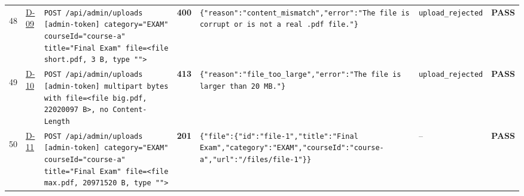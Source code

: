 \documentclass[10pt,a4paper]{article}
\begin{document}
\begin{landscape}
\begin{longtable}{@{}P{0.6cm}P{0.9cm}P{8.5cm}P{1.0cm}P{6.2cm}P{4.2cm}P{1.1cm}@{}}
\hypertarget{call48}{48} & \hyperlink{test-D-09}{D-09} & \texttt{POST /\allowbreak{}api/\allowbreak{}admin/\allowbreak{}uploads [admin-\allowbreak{}token] category=\allowbreak{}"\allowbreak{}EXAM"\allowbreak{} courseId=\allowbreak{}"\allowbreak{}course-\allowbreak{}a"\allowbreak{} title=\allowbreak{}"\allowbreak{}Final Exam"\allowbreak{} file=\allowbreak{}<file short.\allowbreak{}pdf,\allowbreak{} 3 B,\allowbreak{} type "\allowbreak{}"\allowbreak{}>} & \textcolor{warnamber}{\textbf{400}} & \texttt{\{"\allowbreak{}reason"\allowbreak{}:\allowbreak{}"\allowbreak{}content\_\allowbreak{}mismatch"\allowbreak{},\allowbreak{}"\allowbreak{}error"\allowbreak{}:\allowbreak{}"\allowbreak{}The file is corrupt or is not a real .\allowbreak{}pdf file.\allowbreak{}"\allowbreak{}\}} & \texttt{upload\_\allowbreak{}rejected} & \textcolor{passgreen}{\textbf{PASS}} \\
\hypertarget{call49}{49} & \hyperlink{test-D-10}{D-10} & \texttt{POST /\allowbreak{}api/\allowbreak{}admin/\allowbreak{}uploads [admin-\allowbreak{}token] multipart bytes with file=\allowbreak{}<file big.\allowbreak{}pdf,\allowbreak{} 22020097 B>,\allowbreak{} no Content-\allowbreak{}Length} & \textcolor{warnamber}{\textbf{413}} & \texttt{\{"\allowbreak{}reason"\allowbreak{}:\allowbreak{}"\allowbreak{}file\_\allowbreak{}too\_\allowbreak{}large"\allowbreak{},\allowbreak{}"\allowbreak{}error"\allowbreak{}:\allowbreak{}"\allowbreak{}The file is larger than 20 MB.\allowbreak{}"\allowbreak{}\}} & \texttt{upload\_\allowbreak{}rejected} & \textcolor{passgreen}{\textbf{PASS}} \\
\hypertarget{call50}{50} & \hyperlink{test-D-11}{D-11} & \texttt{POST /\allowbreak{}api/\allowbreak{}admin/\allowbreak{}uploads [admin-\allowbreak{}token] category=\allowbreak{}"\allowbreak{}EXAM"\allowbreak{} courseId=\allowbreak{}"\allowbreak{}course-\allowbreak{}a"\allowbreak{} title=\allowbreak{}"\allowbreak{}Final Exam"\allowbreak{} file=\allowbreak{}<file max.\allowbreak{}pdf,\allowbreak{} 20971520 B,\allowbreak{} type "\allowbreak{}"\allowbreak{}>} & \textcolor{passgreen}{\textbf{201}} & \texttt{\{"\allowbreak{}file"\allowbreak{}:\allowbreak{}\{"\allowbreak{}id"\allowbreak{}:\allowbreak{}"\allowbreak{}file-\allowbreak{}1"\allowbreak{},\allowbreak{}"\allowbreak{}title"\allowbreak{}:\allowbreak{}"\allowbreak{}Final Exam"\allowbreak{},\allowbreak{}"\allowbreak{}category"\allowbreak{}:\allowbreak{}"\allowbreak{}EXAM"\allowbreak{},\allowbreak{}"\allowbreak{}courseId"\allowbreak{}:\allowbreak{}"\allowbreak{}course-\allowbreak{}a"\allowbreak{},\allowbreak{}"\allowbreak{}url"\allowbreak{}:\allowbreak{}"\allowbreak{}/\allowbreak{}files/\allowbreak{}file-\allowbreak{}1"\allowbreak{}\}\}} & -- & \textcolor{passgreen}{\textbf{PASS}} \\

\end{longtable}
\end{landscape}
\end{document}

